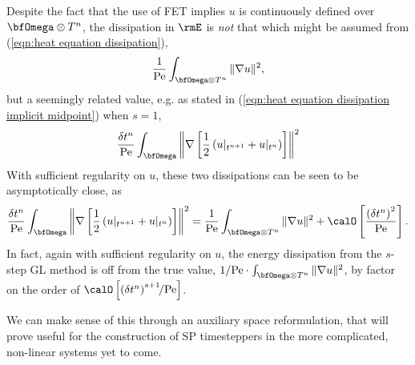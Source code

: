     Despite the fact that the use of FET implies $u$ is continuously defined over $\bfOmega\otimes T^{n}$, the dissipation in $\rmE$ is \emph{not} that which might be assumed from (\ref{eqn:heat equation dissipation}),
    \begin{equation}
        \frac{1}{\rmPe}\int_{\bfOmega\otimes T^{n}}\|\nabla u\|^{2},
    \end{equation}
    but a seemingly related value, e.g. as stated in (\ref{eqn:heat equation dissipation implicit midpoint}) when $s = 1$,
    \begin{equation}
        \frac{\delta t^{n}}{\rmPe}\int_{\bfOmega}\left\|\nabla\left[\frac{1}{2}\left(u|_{t^{n + 1}} + u|_{t^{n}}\right)\right]\right\|^{2}
    \end{equation}
    With sufficient regularity on $u$, these two dissipations can be seen to be asymptotically close, as
    \begin{equation}
      \frac{\delta t^{n}}{\rmPe}\int_{\bfOmega}\left\|\nabla\left[\frac{1}{2}\left(u|_{t^{n + 1}} + u|_{t^{n}}\right)\right]\right\|^{2}  =  \frac{1}{\rmPe}\int_{\bfOmega\otimes T^{n}}\|\nabla u\|^{2} + \calO\left[\frac{\left(\delta t^{n}\right)^{2}}{\rmPe}\right].
    \end{equation}
    In fact, again with sufficient regularity on $u$, the energy dissipation from the $s$-step GL method is off from the true value, $1/\rmPe\cdot\int_{\bfOmega\otimes T^{n}}\|\nabla u\|^{2}$, by factor on the order of $\calO\left[\left(\delta t^{n}\right)^{s + 1}\!\!/\rmPe\right]$.
    
    \shortline

    We can make sense of this through an auxiliary space reformulation, that will prove useful for the construction of SP timesteppers in the more complicated, non-linear systems yet to come.

    \shortline


